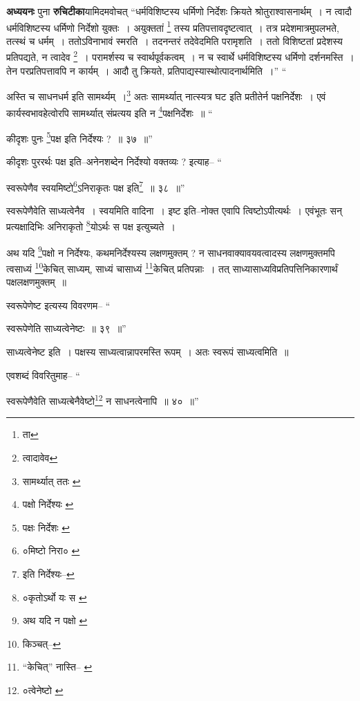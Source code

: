 \documentclass[article,12pt,a4paper]{memoir}
\begin{document}
	  \pstart \textbf{अध्ययनः} पुना \textbf{रुचिटीका}यामिदमवोचत् “धर्मविशिष्टस्य धर्मिणो निर्देशः क्रियते श्रोतुराश्वासनार्थम् । न त्वादौ धर्मविशिष्टस्य धर्मिणो निर्देशो युक्तः । अयुक्ततां \footnote{ता} तस्य प्रतिपत्तावदृष्टत्वात् । तत्र प्रदेशमात्रमुपलभते, तत्स्थं च धर्मम् । ततोऽविनाभावं स्मरति । तदनन्तरं तदेवेदमिति परामृशति । ततो विशिष्टतां प्रदेशस्य प्रतिपद्यते, न त्वादेव \footnote{त्वादावेव} । परामर्शस्य च स्वार्थपूर्वकत्वम् । न च स्वार्थे धर्मविशिष्टस्य धर्मिणो दर्शनमस्ति । तेन परप्रतिपत्तावपि न कार्यम् । आदौ तु क्रियते, प्रतिपाद्यस्यास्थोत्पादनार्थमिति ।” \leavevmode{} “
	  
	अस्ति च साधनधर्म इति सामर्थ्यम् ।\footnote{सामर्थ्यात् ततः \cite{dp-msA} \cite{dp-msB} \cite{dp-edP} \cite{dp-edH} \cite{dp-edN}} अतः सामर्थ्यात् नात्स्यत्र घट इति प्रतीतेर्न पक्षनिर्देशः । एवं कार्यस्वभावहेत्वोरपि सामर्थ्यात् संप्रत्यय इति न \footnote{पक्षो निर्देश्यः \cite{dp-edE}}पक्षनिर्देशः ॥ “
	  
	कीदृशः पुनः \footnote{पक्षः निर्देशः \cite{dp-msC}}पक्ष इति निर्देश्यः ? ॥ ३७ ॥” 
	  
	कीदृशः पुररर्थः पक्ष इति--अनेनशब्देन निर्देश्यो वक्तव्यः ? इत्याह-- “
	  
	स्वरूपेणैव स्वयमिष्टो\footnote{०मिष्टो निरा० \cite{dp-msB} \cite{dp-edP}}ऽनिराकृतः पक्ष इति\footnote{इति निर्देश्यः--\cite{dp-msC}} ॥ ३८ ॥” 
	  
	स्वरूपेणैवेति साध्यत्वेनैव । स्वयमिति वादिना । इष्ट इति--नोक्त एवापि त्विष्टोऽपीत्यर्थः । एवंभूतः सन् प्रत्यक्षादिभिः अनिराकृतो \footnote{०कृतोऽर्थो यः स \cite{dp-msB} \cite{dp-msC} \cite{dp-msD}}योऽर्थः स पक्ष इत्युच्यते । 
	  
	अथ यदि \footnote{अथ यदि न पक्षो \cite{dp-msA} \cite{dp-msB} \cite{dp-edP} \cite{dp-edH} \cite{dp-edE} \cite{dp-edN}}पक्षो न निर्देश्यः, कथमनिर्देश्यस्य लक्षणमुक्तम् ? न साधनवाक्यावयवत्वादस्य लक्षणमुक्तमपि त्वसाध्यं \footnote{किञ्चत्--\cite{dp-msB}}केचित् साध्यम्, साध्यं चासाध्यं \footnote{“केचित्” नास्ति--\cite{dp-msC} \cite{dp-msA} \cite{dp-edP} \cite{dp-edH} \cite{dp-edE} \cite{dp-edN}}केचित् प्रतिपन्नाः । तत् साध्यासाध्यविप्रतिपत्तिनिकारणार्थं पक्षलक्षणमुक्तम् ॥ 
	  
	स्वरूपेणेष्ट इत्यस्य विवरणम-- “
	  
	स्वरूपेणेति साध्यत्वेनेष्टः ॥ ३९ ॥” 
	  
	साध्यत्वेनेष्ट इति । पक्षस्य साध्यत्वान्नापरमस्ति रूपम् । अतः स्वरूपं साध्यत्वमिति ॥ 
	  
	एवशब्दं विवरितुमाह-- “
	  
	स्वरूपेणैवेति साध्यत्बेनैवेष्टो\footnote{०त्वेनेष्टो \cite{dp-msC} \cite{dp-msB} \cite{dp-edH} \cite{dp-edP} \cite{dp-edE} \cite{dp-edN}} न साधनत्वेनापि ॥ ४० ॥” 
	  
\end{document}
